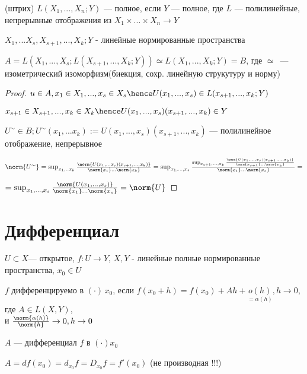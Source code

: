 \begin{theorem}
    (штрих) $L(X_1, ..., X_n; Y)$ --- полное, если $Y$ --- полное, где $L$ --- полилинейные, непрерывные отображения из $X_1 \times ... \times X_n \to Y$
\end{theorem}

\begin{theorem}
    $X_1, ... X_s, X_{s + 1},...,X_k; Y$ - линейные нормированные пространства

    $A = L(X_1, ..., X_s; L(X_{s + 1}, ..., X_k; Y)) \simeq L(X_1, ..., X_k; Y) = B$,
    где $\simeq$~--- изометрический изоморфизм(биекция, сохр. линейную струкутуру и норму)
\end{theorem}

\begin{proof}
    $u \in A, x_1 \in X_1, ..., x_s \in X_s \hence U(x_1, ..., x_s) \in L(x_{s + 1}, ..., x_k; Y)$

    $x_{s + 1} \in X_{s + 1}, ..., x_k \in X_k \hence U(x_1,..., x_s)(x_{s + 1}, ..., x_{k}) \in Y$
    
    $U^{\sim} \in B;  U^{\sim} (x_1, ... x_k) := U(x_1, ..., x_s)(x_{s + 1}, ..., x_k)$ --- полилинейное отображение, непрерывное

    $\norm{U^\sim} = \sup_{x_1,..x_k} \frac{\norm{U(x_1, ... x_s)(x_{s+1}, ..., x_k)}}{\norm{x_1} ... \norm{x_k}} = \sup_{x_1, ..., x_s} \frac{ \sup_{x_{s+1}, ..., x_k} \frac{\norm{U(x_1, ..., x_s)(x_{s + 1}, ... , x_k)}}{\norm{x_{s + 1}} ... \norm{x_k}}}{\norm{x_1} ... \norm{x_s}} =$

    $ = \sup_{x_1,..., x_s}{\frac{\norm{U(x_1,...,x_s)}}{\norm{x_1} ... \norm{x_s}}} = \norm{U}$
\end{proof}


\section{Дифференциал}

\begin{definition}
    $U \subset X$--- открытое, $f : U \to Y$, $X, Y$ - линейные полные нормированные пространства, $x_0 \in U$
    

    $f$ дифференцируемо в $(\cdot)\, x_0$, если $f(x_0 + h) = f(x_0) + Ah + \underset{ = \alpha(h)}{o(h)}, h \to 0$, где $A \in L(X, Y)$, \\ и $\frac{\norm{\alpha(h)}}{\norm{h}} \to 0, h \to 0$

    $A$ --- дифференциал $f$ в $(\cdot) x_0$

    $A = df(x_0) = d_{x_0}f = D_{x_0}f = f'(x_0)$ (не производная !!!)
\end{definition}


